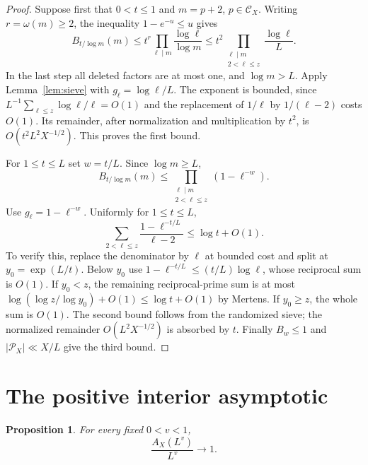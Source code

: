 \documentclass[11pt]{article}
\newtheorem{proposition}[theorem]{Proposition}
\theoremstyle{remark}
\begin{document}
\begin{proof}
Suppose first that $0<t\le1$ and $m=p+2$, $p\in\mathcal C_X$.
Writing $r=\omega(m)\ge2$, the inequality $1-e^{-u}\le u$ gives
\[
 B_{t/\log m}(m)
 \le t^r\prod_{\ell\mid m}\frac{\log\ell}{\log m}
 \le t^2\prod_{\substack{\ell\mid m\\2<\ell\le z}}
                     \frac{\log\ell}{L}.
\]
In the last step all deleted factors are at most one, and $\log m>L$.
Apply Lemma~\ref{lem:sieve} with $g_\ell=\log\ell/L$.
The exponent is bounded, since
$L^{-1}\sum_{\ell\le z}\log\ell/\ell=O(1)$ and the replacement of
$1/\ell$ by $1/(\ell-2)$ costs $O(1)$.
Its remainder, after normalization and multiplication by $t^2$, is
$O(t^2L^2X^{-1/2})$. This proves the first bound.

For $1\le t\le L$ set $w=t/L$. Since $\log m\ge L$,
\[
 B_{t/\log m}(m)\le
 \prod_{\substack{\ell\mid m\\2<\ell\le z}}(1-\ell^{-w}).
\]
Use $g_\ell=1-\ell^{-w}$. Uniformly for $1\le t\le L$,
\begin{equation}\label{eq:harmonic-envelope}
 \sum_{2<\ell\le z}\frac{1-\ell^{-t/L}}{\ell-2}
                   \le\log t+O(1).
\end{equation}
To verify this, replace the denominator by $\ell$ at bounded cost
and split at $y_0=\exp(L/t)$. Below $y_0$ use
$1-\ell^{-t/L}\le(t/L)\log\ell$, whose reciprocal sum is $O(1)$.
If $y_0<z$, the remaining reciprocal-prime sum is at most
$\log(\log z/\log y_0)+O(1)\le\log t+O(1)$ by Mertens.
If $y_0\ge z$, the whole sum is $O(1)$.
The second bound follows from the randomized sieve; the normalized
remainder $O(L^2X^{-1/2})$ is absorbed by $t$.
Finally $B_w\le1$ and $|\mathcal P_X|\ll X/L$ give the third bound.
\end{proof}

\section{The positive interior asymptotic}
\begin{proposition}\label{prop:interior}
For every fixed $0<v<1$,
\begin{equation}\label{eq:interior}
                    \frac{A_X(L^v)}{L^v}\longrightarrow1.
\end{equation}
\end{proposition}
\end{document}
